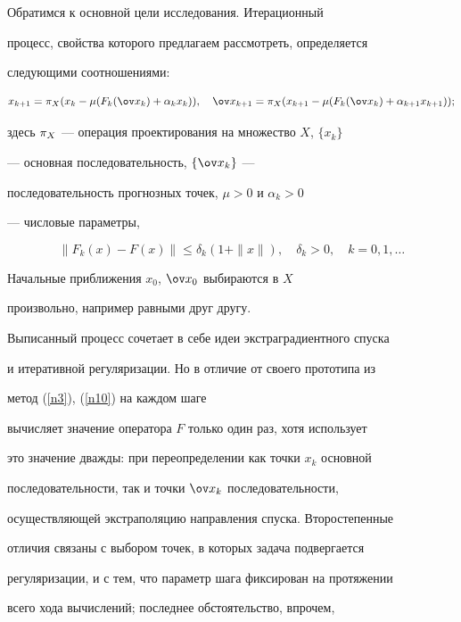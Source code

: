Обратимся к основной цели исследования. Итерационный


процесс, свойства которого предлагаем рассмотреть, определяется


следующими соотношениями:


\begin{equation}\label{n3}


x_{k+1}=\px(x_k-\mu(\Fa)),\quad


\ov x_{k+1}=\px(x_{k+1}-\mu(\Fbb));


\end{equation}


здесь $\pi_X$ --- операция проектирования на множество $X$, $\{x_k\}$


--- основная последовательность, $\{\ov x_k\}$ ---


последовательность прогнозных точек, $\mu>0$ и $\alpha_k>0$


--- числовые параметры,


\begin{equation}\label{n10}


\|F_k(x)-F(x)\|\leq\delta_k(1+\|x\|),\quad \delta_k>0,


\quad k=0,1,\dotsc


\end{equation}


Начальные приближения $x_0$, $\ov x_0$ выбираются в $X$


произвольно, например равными друг другу.





Выписанный процесс сочетает в себе идеи экстраградиентного спуска


и итеративной регуляризации. Но в отличие от своего прототипа из


\cite{ant1} метод (\ref{n3}), (\ref{n10}) на каждом шаге


вычисляет значение оператора $F$ только один раз, хотя использует


это значение дважды: при переопределении как точки $x_k$ основной


последовательности, так и точки $\ov x_k$ последовательности,


осуществляющей экстраполяцию направления спуска. Второстепенные


отличия связаны с выбором точек, в которых задача подвергается


регуляризации, и с тем, что параметр шага фиксирован на протяжении


всего хода вычислений; последнее обстоятельство, впрочем,


